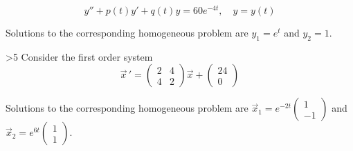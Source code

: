     $$y'' + p(t)y' + q(t)y = 60e^{-4t}, \quad y=y(t)$$    
    
    Solutions to the corresponding homogeneous problem are $y_1 = e^t$ and $y_2 = 1$. 

    \ifnum {} {\color{DarkBlue}  
    
    } 
    \else 
    \fi    
\fi



\ifnum \Version>5
\question[4] Consider the first order system \[\vec{x} \, ' = \left( \begin{array}{rr} 2 & 4 \\ 4 & 2 \end{array} \right) \vec{x}  + \begin{pmatrix} 24\\0\end{pmatrix}  \]
    
    Solutions to the corresponding homogeneous problem are $\vec x_1 = e^{-2t}\begin{pmatrix} 1\\-1\end{pmatrix}$ and $\vec x_2 = e^{6t}\begin{pmatrix} 1\\1\end{pmatrix}$. 

